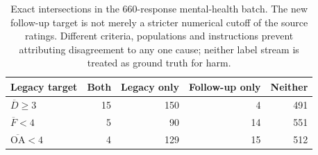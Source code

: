 \begin{table}[t]
\centering\small
\caption{Exact intersections in the 660-response mental-health batch. The new follow-up target is not merely a stricter numerical cutoff of the source ratings. Different criteria, populations and instructions prevent attributing disagreement to any one cause; neither label stream is treated as ground truth for harm.}
\label{tab:annotation_overlap}
\begin{tabular}{lrrrr}
\toprule
Legacy target & Both & Legacy only & Follow-up only & Neither \\
\midrule
$\overline D\geq3$ & 15 & 150 & 4 & 491 \\
$\overline F<4$ & 5 & 90 & 14 & 551 \\
$\overline{\mathrm{OA}}<4$ & 4 & 129 & 15 & 512 \\
\bottomrule
\end{tabular}
\end{table}
